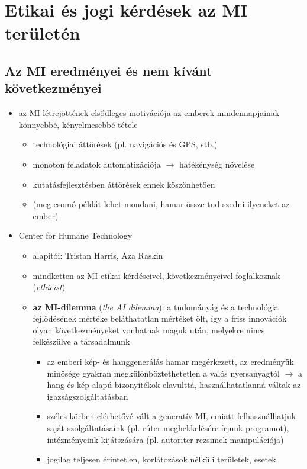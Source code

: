 \documentclass[a4paper, 11pt]{article}
\begin{document}
\newpage

\section{Etikai és jogi kérdések az MI területén}

\subsection{Az MI eredményei és nem kívánt következményei}

\begin{itemize}
	\item az MI létrejöttének elsődleges motivációja az emberek mindennapjainak könnyebbé, kényelmesebbé tétele
	\begin{itemize}
		\item technológiai áttörések (pl. navigációs és GPS, stb.)
		\item monoton feladatok automatizációja $\to$ hatékénység növelése
		\item kutatásfejlesztésben áttörések ennek köszönhetően
		\item (meg csomó példát lehet mondani, hamar össze tud szedni ilyeneket az ember)
	\end{itemize}
	\item Center for Humane Technology
	\begin{itemize}
		\item alapítói: Tristan Harris, Aza Raskin
		\item mindketten az MI etikai kérdéseivel, következményeivel foglalkoznak (\textit{ethicist})
		\item \textbf{az MI-dilemma} (\textit{the AI dilemma}): a tudományág és a technológia fejlődésének mértéke beláthatatlan mértéket ölt, így a friss innovációk olyan következményeket vonhatnak maguk után, melyekre nincs felkészülve a társadalmunk
		\begin{itemize}
			\item az emberi kép- és hanggenerálás hamar megérkezett, az eredményük minősége gyakran megkülönböztethetetlen a valós nyersanyagtól $\to$ a hang és kép alapú bizonyítékok elavulttá, használhatatlanná váltak az igazságszolgáltatásban
			\item széles körben elérhetővé vált a generatív MI, emiatt felhasználhatjuk saját szolgáltatásaink (pl. rúter meghekkelésére írjunk programot), intézményeink kijátszására (pl. autoriter rezsimek manipulációja)
			\item jogilag teljesen érintetlen, korlátozások nélküli területek, esetek

\end{itemize}
\end{itemize}
\end{itemize}
\end{document}
